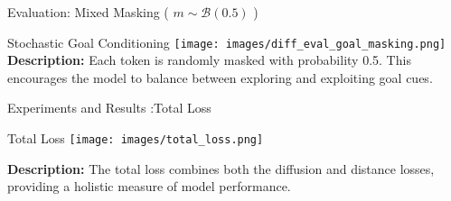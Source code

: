 \documentclass{beamer}
\begin{document}
    \begin{frame}{Evaluation: Mixed Masking ( $m \sim \mathcal{B}(0.5)$ )}
        \begin{block}{Stochastic Goal Conditioning}
            \centering
            \texttt{[image: images/diff\_eval\_goal\_masking.png]}
            \vspace{0.5em}
            \small
            \textbf{Description:} 
            Each token is randomly masked with probability 0.5. This encourages the model to balance between exploring and exploiting goal cues.
        \end{block}
    \end{frame}
\begin{frame}{Experiments and Results :Total Loss}
    \begin{block}{Total Loss}
        \centering
        \texttt{[image: images/total\_loss.png]}
        
        \vspace{0.5em}
        \small
        \textbf{Description:} 
        The total loss combines both the diffusion and distance losses, providing a holistic measure of model performance.
    \end{block}
\end{frame}
\end{document}
